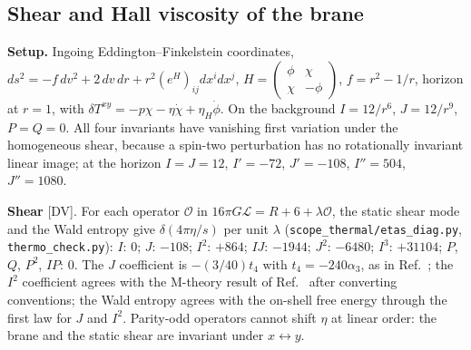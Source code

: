 \subsection{Shear and Hall viscosity of the brane}
\textbf{Setup.} Ingoing Eddington--Finkelstein coordinates,
$ds^2=-f\,dv^2+2\,dv\,dr+r^2(e^{H})_{ij}dx^idx^j$, $H=\begin{pmatrix}\phi&\chi\\\chi&-\phi\end{pmatrix}$, $f=r^2-1/r$, horizon at
$r=1$, with $\delta T^{xy}=-p\chi-\eta\dot\chi+\eta_H\dot\phi$. On the background $I=12/r^6$, $J=12/r^9$, $P=Q=0$. All four
invariants have vanishing first variation under the homogeneous shear, because a spin-two perturbation has no rotationally
invariant linear image; at the horizon $I=J=12$, $I'=-72$, $J'=-108$, $I''=504$, $J''=1080$.

\textbf{Shear} [DV]. For each operator $\mathcal O$ in $16\pi G\mathcal L=R+6+\lambda\mathcal O$, the static shear mode and the Wald
entropy give $\delta(4\pi\eta/s)$ per unit $\lambda$ (\texttt{scope\_thermal/etas\_diag.py}, \texttt{thermo\_check.py}):
$I$: $0$; $J$: $-108$; $I^2$: $+864$; $IJ$: $-1944$; $J^2$: $-6480$; $I^3$: $+31104$; $P$, $Q$, $P^2$, $IP$: $0$. The $J$
coefficient is $-(3/40)t_4$ with $t_4=-240\alpha_3$, as in Ref.~\cite{Li:2019auk}; the $I^2$ coefficient agrees with the M-theory
result of Ref.~\cite{Garousi:2008ai} after converting conventions; the Wald entropy agrees with the on-shell free energy through
the first law for $J$ and $I^2$. Parity-odd operators cannot shift $\eta$ at linear order: the brane and the static shear are
invariant under $x\leftrightarrow y$.

